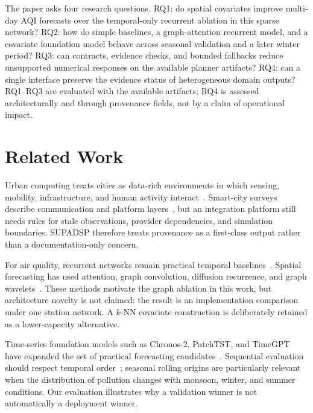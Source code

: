 \documentclass[conference]{IEEEtran}
\begin{document}
The paper asks four research questions. RQ1: do spatial covariates improve multi-day AQI forecasts over the temporal-only recurrent ablation in this sparse network? RQ2: how do simple baselines, a graph-attention recurrent model, and a covariate foundation model behave across seasonal validation and a later winter period? RQ3: can contracts, evidence checks, and bounded fallbacks reduce unsupported numerical responses on the available planner artifacts? RQ4: can a single interface preserve the evidence status of heterogeneous domain outputs? RQ1--RQ3 are evaluated with the available artifacts; RQ4 is assessed architecturally and through provenance fields, not by a claim of operational impact.

\section{Related Work}
Urban computing treats cities as data-rich environments in which sensing, mobility, infrastructure, and human activity interact~\cite{zheng2014urban}. Smart-city surveys describe communication and platform layers~\cite{zanella2014internet,gharaibeh2017smart}, but an integration platform still needs rules for stale observations, provider dependencies, and simulation boundaries. SUPADSP therefore treats provenance as a first-class output rather than a documentation-only concern.

For air quality, recurrent networks remain practical temporal baselines~\cite{hochreiter1997lstm,cho2014gru,rao2021air}. Spatial forecasting has used attention, graph convolution, diffusion recurrence, and graph wavelets~\cite{lin2018geoman,kipf2017gcn,li2018dcrnn,wu2019graphwavenet,velickovic2018gat,qi2019hybrid_aq}. These methods motivate the graph ablation in this work, but architecture novelty is not claimed: the result is an implementation comparison under one station network. A $k$-NN covariate construction is deliberately retained as a lower-capacity alternative.

Time-series foundation models such as Chronos-2, PatchTST, and TimeGPT have expanded the set of practical forecasting candidates~\cite{ansari2025chronos2,nie2023patchtst,garza2023timegpt}. Sequential evaluation should respect temporal order~\cite{tashman2000oof}; seasonal rolling origins are particularly relevant when the distribution of pollution changes with monsoon, winter, and summer conditions. Our evaluation illustrates why a validation winner is not automatically a deployment winner.
\end{document}
